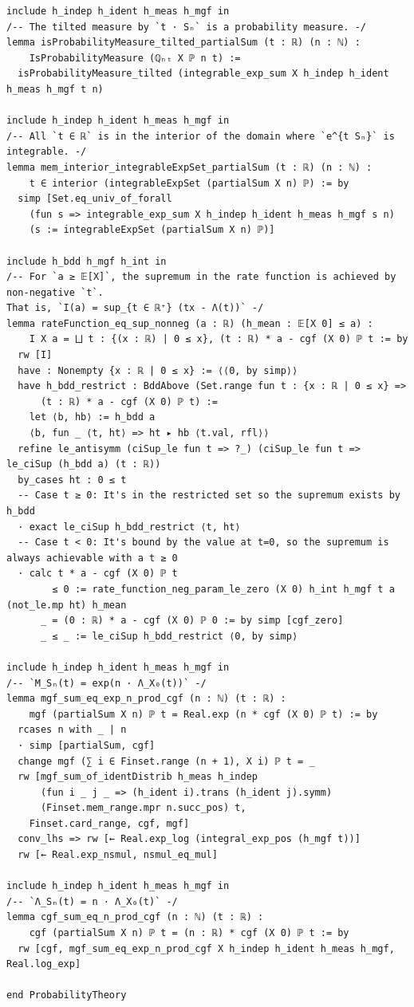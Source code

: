 \newpage
\begin{lstlisting}
include h_indep h_ident h_meas h_mgf in
/-- The tilted measure by `t · Sₙ` is a probability measure. -/
lemma isProbabilityMeasure_tilted_partialSum (t : ℝ) (n : ℕ) :
    IsProbabilityMeasure (ℚₙₜ X ℙ n t) :=
  isProbabilityMeasure_tilted (integrable_exp_sum X h_indep h_ident h_meas h_mgf t n)

include h_indep h_ident h_meas h_mgf in
/-- All `t ∈ ℝ` is in the interior of the domain where `e^{t Sₙ}` is integrable. -/
lemma mem_interior_integrableExpSet_partialSum (t : ℝ) (n : ℕ) :
    t ∈ interior (integrableExpSet (partialSum X n) ℙ) := by
  simp [Set.eq_univ_of_forall
    (fun s => integrable_exp_sum X h_indep h_ident h_meas h_mgf s n)
    (s := integrableExpSet (partialSum X n) ℙ)]

include h_bdd h_mgf h_int in
/-- For `a ≥ 𝔼[X]`, the supremum in the rate function is achieved by non-negative `t`.
That is, `I(a) = sup_{t ∈ ℝ⁺} (tx - Λ(t))` -/
lemma rateFunction_eq_sup_nonneg (a : ℝ) (h_mean : 𝔼[X 0] ≤ a) :
    I X a = ⨆ t : {(x : ℝ) | 0 ≤ x}, (t : ℝ) * a - cgf (X 0) ℙ t := by
  rw [I]
  have : Nonempty {x : ℝ | 0 ≤ x} := ⟨⟨0, by simp⟩⟩
  have h_bdd_restrict : BddAbove (Set.range fun t : {x : ℝ | 0 ≤ x} =>
      (t : ℝ) * a - cgf (X 0) ℙ t) :=
    let ⟨b, hb⟩ := h_bdd a
    ⟨b, fun _ ⟨t, ht⟩ => ht ▸ hb ⟨t.val, rfl⟩⟩
  refine le_antisymm (ciSup_le fun t => ?_) (ciSup_le fun t => le_ciSup (h_bdd a) (t : ℝ))
  by_cases ht : 0 ≤ t
  -- Case t ≥ 0: It's in the restricted set so the supremum exists by h_bdd
  · exact le_ciSup h_bdd_restrict ⟨t, ht⟩
  -- Case t < 0: It's bound by the value at t=0, so the supremum is always achievable with a t ≥ 0
  · calc t * a - cgf (X 0) ℙ t
        ≤ 0 := rate_function_neg_param_le_zero (X 0) h_int h_mgf t a (not_le.mp ht) h_mean
      _ = (0 : ℝ) * a - cgf (X 0) ℙ 0 := by simp [cgf_zero]
      _ ≤ _ := le_ciSup h_bdd_restrict ⟨0, by simp⟩

include h_indep h_ident h_meas h_mgf in
/-- `M_Sₙ(t) = exp(n · Λ_X₀(t))` -/
lemma mgf_sum_eq_exp_n_prod_cgf (n : ℕ) (t : ℝ) :
    mgf (partialSum X n) ℙ t = Real.exp (n * cgf (X 0) ℙ t) := by
  rcases n with _ | n
  · simp [partialSum, cgf]
  change mgf (∑ i ∈ Finset.range (n + 1), X i) ℙ t = _
  rw [mgf_sum_of_identDistrib h_meas h_indep
      (fun i _ j _ => (h_ident i).trans (h_ident j).symm)
      (Finset.mem_range.mpr n.succ_pos) t,
    Finset.card_range, cgf, mgf]
  conv_lhs => rw [← Real.exp_log (integral_exp_pos (h_mgf t))]
  rw [← Real.exp_nsmul, nsmul_eq_mul]

include h_indep h_ident h_meas h_mgf in
/-- `Λ_Sₙ(t) = n · Λ_X₀(t)` -/
lemma cgf_sum_eq_n_prod_cgf (n : ℕ) (t : ℝ) :
    cgf (partialSum X n) ℙ t = (n : ℝ) * cgf (X 0) ℙ t := by
  rw [cgf, mgf_sum_eq_exp_n_prod_cgf X h_indep h_ident h_meas h_mgf, Real.log_exp]

end ProbabilityTheory
\end{lstlisting}

